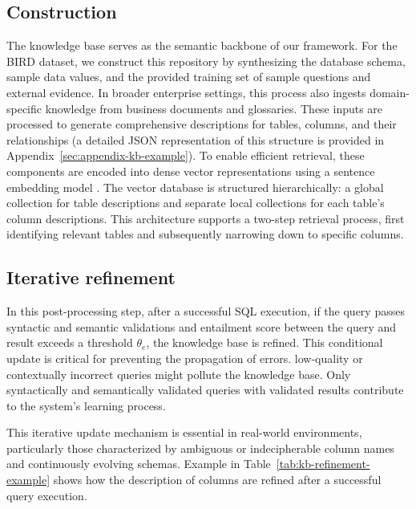 \documentclass[runningheads]{llncs}
\begin{document}
\subsection{Construction}
The knowledge base serves as the semantic backbone of our framework. For the BIRD\cite{li2023bird} dataset, we construct this repository by synthesizing the database schema, sample data values, and the provided training set of sample questions and external evidence. In broader enterprise settings, this process also ingests domain-specific knowledge from business documents and glossaries. These inputs are processed to generate comprehensive descriptions for tables, columns, and their relationships (a detailed JSON representation of this structure is provided in Appendix~\ref{sec:appendix-kb-example}). To enable efficient retrieval, these components are encoded into dense vector representations using a sentence embedding model \cite{reimers2019sentence}. The vector database is structured hierarchically: a global collection for table descriptions and separate local collections for each table's column descriptions. This architecture supports a two-step retrieval process, first identifying relevant tables and subsequently narrowing down to specific columns.

\subsection{Iterative refinement}
In this post-processing step, after a successful SQL execution, if the query passes syntactic and semantic validations and entailment score between the query and result exceeds a threshold $\theta_e$, the knowledge base is refined. This conditional update is critical for preventing the propagation of errors. low-quality or contextually incorrect queries might pollute the knowledge base. Only syntactically and semantically validated queries with validated results contribute to the system's learning process.

This iterative update mechanism is essential in real-world environments, particularly those characterized by ambiguous or indecipherable column names and continuously evolving schemas. Example in Table~\ref{tab:kb-refinement-example} shows how the description of columns are refined after a successful query execution.
\end{document}
